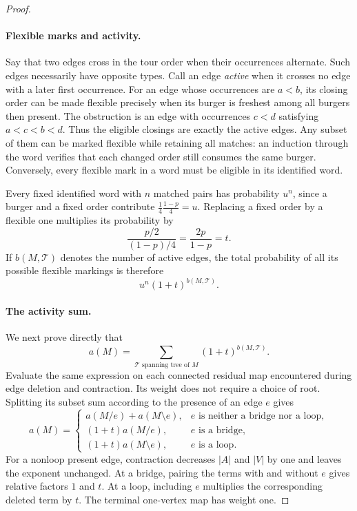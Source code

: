 \begin{proof}
\paragraph{Flexible marks and activity.}
Say that two edges cross in the tour order when their occurrences
alternate. Such edges necessarily have opposite types. Call an edge
\emph{active} when it crosses no edge with a later first occurrence.
For an edge whose occurrences are $a<b$, its closing order can be made
flexible precisely when its burger is freshest among all burgers then
present. The obstruction is an edge with occurrences $c<d$ satisfying
$a<c<b<d$. Thus the eligible closings are exactly the active edges.
Any subset of them can be marked flexible while retaining all matches:
an induction through the word verifies that each changed order still
consumes the same burger. Conversely, every flexible mark in a word must
be eligible in its identified word.

Every fixed identified word with $n$ matched pairs has probability
$u^n$, since a burger and a fixed order contribute
$\frac14\frac{1-p}{4}=u$. Replacing a fixed order by a flexible one
multiplies its probability by
\[
 \frac{p/2}{(1-p)/4}=\frac{2p}{1-p}=t.
\]
If $b(M,\mathcal T)$ denotes the number of active edges, the total
probability of all its possible flexible markings is therefore
\begin{equation}\label{word:markedweight}
 u^n(1+t)^{b(M,\mathcal T)}.
\end{equation}

\paragraph{The activity sum.}
We next prove directly that
\begin{equation}\label{word:activity}
 a(M)=\sum_{\mathcal T\text{ spanning tree of }M}
          (1+t)^{b(M,\mathcal T)}.
\end{equation}
Evaluate the same expression on each connected residual map encountered
during edge deletion and contraction. Its weight does not require a
choice of root. Splitting its subset sum according to the
presence of an edge $e$ gives
\begin{equation}\label{word:deletion-contraction}
 a(M)=
 \begin{cases}
 a(M/e)+a(M\setminus e),&e\text{ is neither a bridge nor a loop},\\
 (1+t)a(M/e),&e\text{ is a bridge},\\
 (1+t)a(M\setminus e),&e\text{ is a loop}.
 \end{cases}
\end{equation}
For a nonloop present edge, contraction decreases $|A|$ and $|V|$ by
one and leaves the exponent unchanged. At a bridge, pairing the terms
with and without $e$ gives relative factors $1$ and $t$. At a loop,
including $e$ multiplies the corresponding deleted term by $t$.
The terminal one-vertex map has weight one.


\end{proof}
